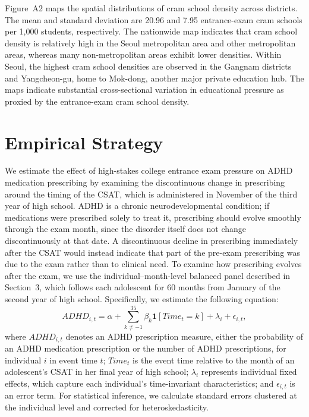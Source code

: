 \documentclass[12pt]{article}
\begin{document}
Figure~A2 maps the spatial distributions of cram school density across districts. The mean and standard deviation are 20.96 and 7.95 entrance-exam cram schools per 1,000 students, respectively. The nationwide map indicates that cram school density is relatively high in the Seoul metropolitan area and other metropolitan areas, whereas many non-metropolitan areas exhibit lower densities. Within Seoul, the highest cram school densities are observed in the Gangnam districts and Yangcheon-gu, home to Mok-dong, another major private education hub. The maps indicate substantial cross-sectional variation in educational pressure as proxied by the entrance-exam cram school density.

\section{Empirical Strategy}

We estimate the effect of high-stakes college entrance exam pressure on ADHD medication prescribing by examining the discontinuous change in prescribing around the timing of the CSAT, which is administered in November of the third year of high school. ADHD is a chronic neurodevelopmental condition; if medications were prescribed solely to treat it, prescribing should evolve smoothly through the exam month, since the disorder itself does not change discontinuously at that date. A discontinuous decline in prescribing immediately after the CSAT would instead indicate that part of the pre-exam prescribing was due to the exam rather than to clinical need. To examine how prescribing evolves after the exam, we use the individual--month-level balanced panel described in Section~3, which follows each adolescent for 60 months from January of the second year of high school. Specifically, we estimate the following equation:
\begin{equation}
  ADHD_{i,t} = \alpha + \sum_{k \neq -1}^{35} \beta_k \mathbf{1}[Time_t = k] + \lambda_i + \epsilon_{i,t},
  \label{eq:es}
\end{equation}
where $ADHD_{i,t}$ denotes an ADHD prescription measure, either the probability of an ADHD medication prescription or the number of ADHD prescriptions, for individual $i$ in event time $t$; $Time_t$ is the event time relative to the month of an adolescent's CSAT in her final year of high school; $\lambda_i$ represents individual fixed effects, which capture each individual's time-invariant characteristics; and $\epsilon_{i,t}$ is an error term. For statistical inference, we calculate standard errors clustered at the individual level and corrected for heteroskedasticity.
\end{document}
